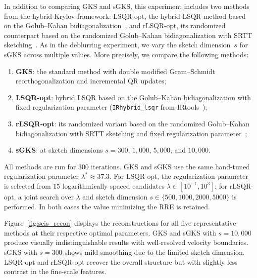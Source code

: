 \documentclass[%
  a4paper,
  onecolumn,
  colorlinks,
]{preprint}
\theoremstyle{plain}
\theoremstyle{definition}
\begin{document}
In addition to comparing GKS and sGKS, this experiment includes
two methods from the hybrid Krylov framework: LSQR-opt, the hybrid
LSQR method based on the Golub--Kahan
bidiagonalization~\cite{ChungGazzola25,GazzolaNagyPer19}, and
rLSQR-opt, its randomized counterpart based on the randomized
Golub--Kahan bidiagonalization with SRTT
sketching~\cite{ChungGazzola25}.
As in the deblurring experiment, we vary the sketch dimension~$s$
for sGKS across multiple values.
More precisely, we compare the following methods:
\begin{enumerate}
  \item [$\diamond$] \textbf{GKS}: the standard method with double modified
        Gram--Schmidt reorthogonalization and incremental QR updates;
  \item [$\diamond$] \textbf{LSQR-opt}: hybrid LSQR based on the Golub--Kahan
        bidiagonalization with fixed regularization parameter
        (\texttt{IRhybrid\_lsqr} from
        IRtools~\cite{GazzolaNagyPer19});
  \item [$\diamond$] \textbf{rLSQR-opt}: its randomized variant based on the
        randomized Golub--Kahan bidiagonalization with SRTT sketching
        and fixed regularization parameter~\cite{ChungGazzola25};
  \item [$\diamond$] \textbf{sGKS}: at sketch dimensions
        $s = 300$, $1{,}000$, $5{,}000$, and $10{,}000$.
\end{enumerate}
All methods are run for $300$ iterations.
GKS and sGKS use the same hand-tuned regularization parameter
$\lambda^* \approx 37.3$.
For LSQR-opt, the regularization parameter is selected from $15$
logarithmically spaced candidates $\lambda \in [10^{-1}, 10^3]$;
for rLSQR-opt, a joint search over $\lambda$ and sketch dimension
$s \in \{500, 1000, 2000, 5000\}$ is performed.
In both cases the value minimizing the RRE is retained.

Figure~\ref{fig:seis_recon} displays the reconstructions for all five
representative methods at their respective optimal parameters.
GKS and sGKS with $s = 10{,}000$ produce visually indistinguishable
results with well-resolved velocity boundaries.
sGKS with $s = 300$ shows mild smoothing due to the limited sketch
dimension.
LSQR-opt and rLSQR-opt recover the overall structure but with
slightly less contrast in the fine-scale features.
\end{document}
